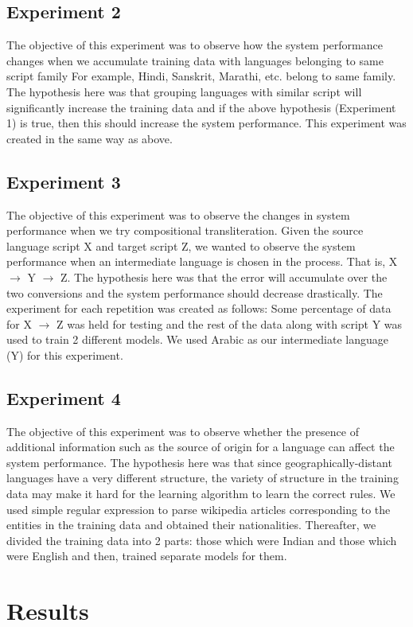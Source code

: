 \documentclass[11pt,a4paper]{article}
\begin{document}
\subsection{Experiment 2}
The objective of this experiment was to observe how the system performance changes when we accumulate training data with languages belonging to same script family For example, Hindi, Sanskrit, Marathi, etc. belong to same family. The hypothesis here was that grouping languages with similar script will significantly increase the training data and if the above hypothesis (Experiment 1) is true, then this should increase the system performance. This experiment was created in the same way as above.

\subsection{Experiment 3}
The objective of this experiment was to observe the changes in system performance when we try compositional transliteration. Given the source language script X and target script Z, we wanted to observe the system performance when an intermediate language is chosen in the process. That is, X $\to$ Y $\to$ Z. The hypothesis here was that the error will accumulate over the two conversions and the system performance should decrease drastically. The experiment for each repetition was created as follows: Some percentage of data for X $\to$ Z was held for testing and the rest of the data along with script Y was used to train 2 different models. We used Arabic as our intermediate language (Y) for this experiment.

\subsection{Experiment 4}
The objective of this experiment was to observe whether the presence of additional information such as the source of origin for a language can affect the system performance. The hypothesis here was that since geographically-distant languages have a very different structure, the variety of structure in the training data may make it hard for the learning algorithm to learn the correct rules. We used simple regular expression to parse wikipedia articles corresponding to the entities in the training data and obtained their nationalities. Thereafter, we divided the training data into 2 parts: those which were Indian and those which were English and then, trained separate models for them.

\section{Results}
\end{document}
